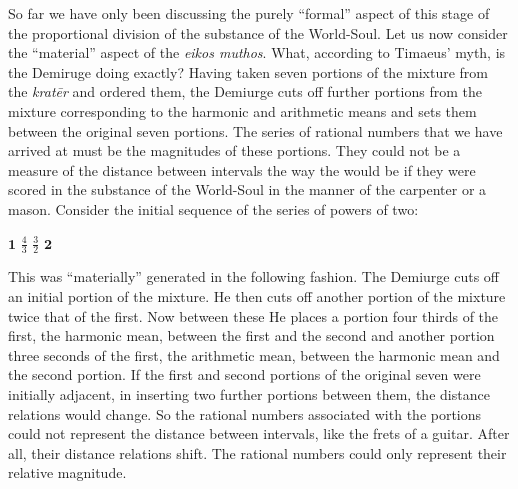 So far we have only been discussing the purely ``formal'' aspect of this stage of the proportional division of the substance of the World-Soul. Let us now consider the ``material'' aspect of the \emph{eikos muthos}. What, according to Timaeus' myth, is the Demiruge doing exactly? Having taken seven portions of the mixture from the \emph{kratēr} and ordered them, the Demiurge cuts off further portions from the mixture corresponding to the harmonic and arithmetic means and sets them between the original seven portions. The series of rational numbers that we have arrived at must be the magnitudes of these portions. They could not be a measure of the distance between intervals the way the would be if they were scored in the substance of the World-Soul in the manner of the carpenter or a mason. Consider the initial sequence of the series of powers of two:
\begin{center}
	\( \mathbf{1} \) \( \frac{4}{3} \) \( \frac{3}{2} \) \( \mathbf{2} \)
\end{center}
This was ``materially'' generated in the following fashion. The Demiurge cuts off an initial portion of the mixture. He then cuts off another portion of the mixture twice that of the first. Now between these He places a portion four thirds of the first, the harmonic mean, between the first and the second and another portion three seconds of the first, the arithmetic mean, between the harmonic mean and the second portion. If the first and second portions of the original seven were initially adjacent, in inserting two further portions between them, the distance relations would change. So the rational numbers associated with the portions could not represent the distance between intervals, like the frets of a guitar. After all, their distance relations shift. The rational numbers could only represent their relative magnitude.

